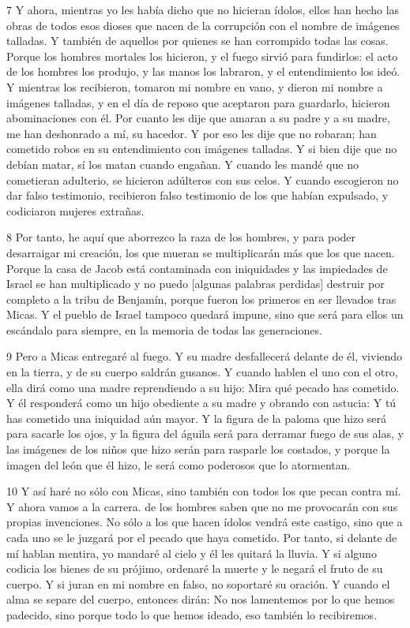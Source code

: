 \par 7 Y ahora, mientras yo les había dicho que no hicieran ídolos, ellos han hecho las obras de todos esos dioses que nacen de la corrupción con el nombre de imágenes talladas. Y también de aquellos por quienes se han corrompido todas las cosas. Porque los hombres mortales los hicieron, y el fuego sirvió para fundirlos: el acto de los hombres los produjo, y las manos los labraron, y el entendimiento los ideó. Y mientras los recibieron, tomaron mi nombre en vano, y dieron mi nombre a imágenes talladas, y en el día de reposo que aceptaron para guardarlo, hicieron abominaciones con él. Por cuanto les dije que amaran a su padre y a su madre, me han deshonrado a mí, su hacedor. Y por eso les dije que no robaran; han cometido robos en su entendimiento con imágenes talladas. Y si bien dije que no debían matar, sí los matan cuando engañan. Y cuando les mandé que no cometieran adulterio, se hicieron adúlteros con sus celos. Y cuando escogieron no dar falso testimonio, recibieron falso testimonio de los que habían expulsado, y codiciaron mujeres extrañas.

\par 8 Por tanto, he aquí que aborrezco la raza de los hombres, y para poder desarraigar mi creación, los que mueran se multiplicarán más que los que nacen. Porque la casa de Jacob está contaminada con iniquidades y las impiedades de Israel se han multiplicado y no puedo [algunas palabras perdidas] destruir por completo a la tribu de Benjamín, porque fueron los primeros en ser llevados tras Micas. Y el pueblo de Israel tampoco quedará impune, sino que será para ellos un escándalo para siempre, en la memoria de todas las generaciones.

\par 9 Pero a Micas entregaré al fuego. Y su madre desfallecerá delante de él, viviendo en la tierra, y de su cuerpo saldrán gusanos. Y cuando hablen el uno con el otro, ella dirá como una madre reprendiendo a su hijo: Mira qué pecado has cometido. Y él responderá como un hijo obediente a su madre y obrando con astucia: Y tú has cometido una iniquidad aún mayor. Y la figura de la paloma que hizo será para sacarle los ojos, y la figura del águila será para derramar fuego de sus alas, y las imágenes de los niños que hizo serán para rasparle los costados, y porque la imagen del león que él hizo, le será como poderosos que lo atormentan.

\par 10 Y así haré no sólo con Micas, sino también con todos los que pecan contra mí. Y ahora vamos a la carrera. de los hombres saben que no me provocarán con sus propias invenciones. No sólo a los que hacen ídolos vendrá este castigo, sino que a cada uno se le juzgará por el pecado que haya cometido. Por tanto, si delante de mí hablan mentira, yo mandaré al cielo y él les quitará la lluvia. Y si alguno codicia los bienes de su prójimo, ordenaré la muerte y le negará el fruto de su cuerpo. Y si juran en mi nombre en falso, no soportaré su oración. Y cuando el alma se separe del cuerpo, entonces dirán: No nos lamentemos por lo que hemos padecido, sino porque todo lo que hemos ideado, eso también lo recibiremos.

